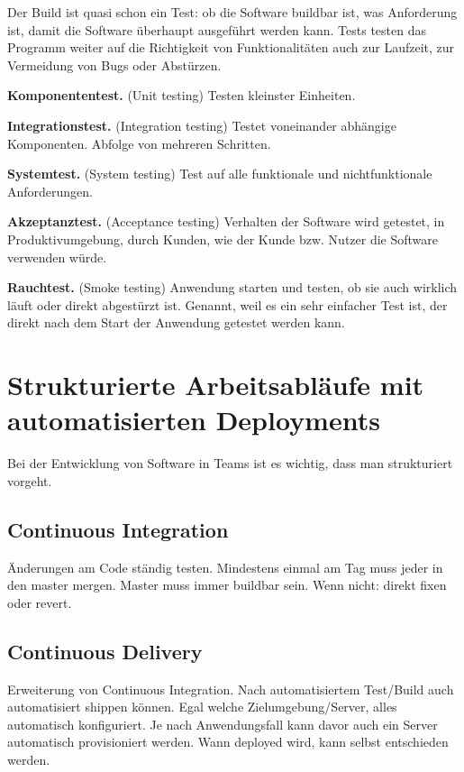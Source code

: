 Der Build ist quasi schon ein Test: ob die Software buildbar ist, was Anforderung ist, damit die Software überhaupt ausgeführt werden kann. Tests testen das Programm weiter auf die Richtigkeit von Funktionalitäten auch zur Laufzeit, zur Vermeidung von Bugs oder Abstürzen.

\textbf{Komponententest.} (Unit testing) Testen kleinster Einheiten.

\textbf{Integrationstest.} (Integration testing) Testet voneinander abhängige Komponenten. Abfolge von mehreren Schritten.

\textbf{Systemtest.} (System testing) Test auf alle funktionale und nichtfunktionale Anforderungen.

\textbf{Akzeptanztest.} (Acceptance testing) Verhalten der Software wird getestet, in Produktivumgebung, durch Kunden, wie der Kunde bzw. Nutzer die Software verwenden würde.

\textbf{Rauchtest.} (Smoke testing) Anwendung starten und testen, ob sie auch wirklich läuft oder direkt abgestürzt ist. Genannt, weil es ein sehr einfacher Test ist, der direkt nach dem Start der Anwendung getestet werden kann.


\section{Strukturierte Arbeitsabläufe mit automatisierten Deployments}

Bei der Entwicklung von Software in Teams ist es wichtig, dass man strukturiert vorgeht.

\subsection{Continuous Integration}

Änderungen am Code ständig testen. Mindestens einmal am Tag muss jeder in den master mergen. Master muss immer buildbar sein. Wenn nicht: direkt fixen oder revert.

\subsection{Continuous Delivery}

Erweiterung von Continuous Integration. Nach automatisiertem Test/Build auch automatisiert shippen können. Egal welche Zielumgebung/Server, alles automatisch konfiguriert. Je nach Anwendungsfall kann davor auch ein Server automatisch provisioniert werden. Wann deployed wird, kann selbst entschieden werden.

